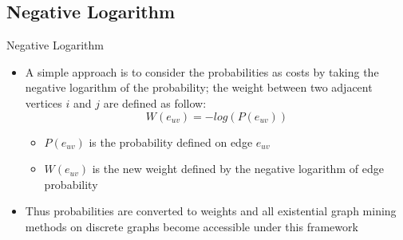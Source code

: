 \documentclass[10pt]{beamer}
\newcommand{\themename}{\textbf{\textsc{metropolis}}\xspace}
\begin{document}
\subsection{Negative Logarithm \cite{potamias2009nearest}}
\begin{frame}{Negative Logarithm \cite{potamias2009nearest}}
\begin{itemize}
\item A simple approach is to consider the probabilities
as costs by taking the negative logarithm of the probability; the weight between two adjacent vertices $i$ and $j$ are defined as follow:
\begin{equation*}
W(e_{uv}) = -log(P(e_{uv}))
\end{equation*}
\vspace{-0.2in}
\begin{itemize}
\item $P(e_{uv})$ is the probability defined on edge $e_{uv}$
\item $W(e_{uv})$ is the new weight defined by the negative logarithm of edge probability
\end{itemize}
\item Thus probabilities are converted to weights and all existential graph mining methods on discrete graphs become accessible under this framework
\end{itemize}
\end{frame}


\end{document}
